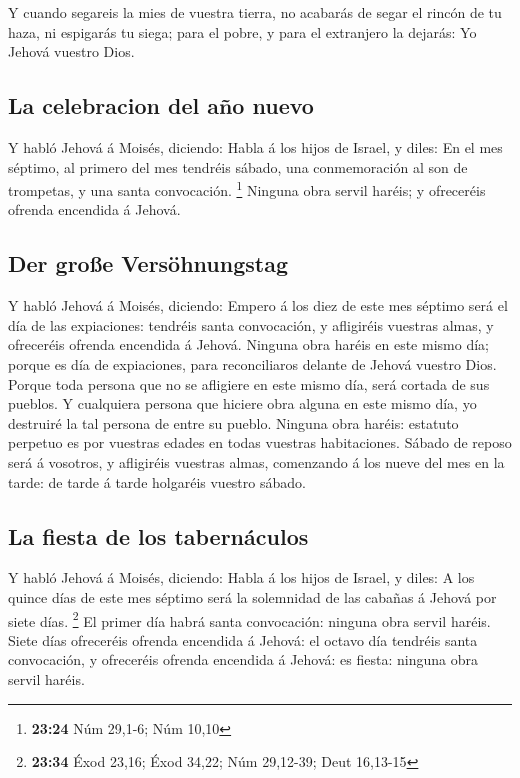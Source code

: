  Y cuando segareis la mies de vuestra tierra, no acabarás
de segar el rincón de tu haza, ni espigarás tu siega; para el pobre, y
para el extranjero la dejarás: Yo Jehová vuestro Dios.

\hypertarget{la-celebracion-del-auxf1o-nuevo}{%
\subsection{La celebracion del año
nuevo}\label{la-celebracion-del-auxf1o-nuevo}}

 Y habló Jehová á Moisés, diciendo:  Habla á
los hijos de Israel, y diles: En el mes séptimo, al primero del mes
tendréis sábado, una conmemoración al son de trompetas, y una santa
convocación. \footnote{\textbf{23:24} Núm 29,1-6; Núm 10,10}
 Ninguna obra servil haréis; y ofreceréis ofrenda encendida
á Jehová.

\hypertarget{der-grouxdfe-versuxf6hnungstag}{%
\subsection{Der große
Versöhnungstag}\label{der-grouxdfe-versuxf6hnungstag}}

 Y habló Jehová á Moisés, diciendo:  Empero á
los diez de este mes séptimo será el día de las expiaciones: tendréis
santa convocación, y afligiréis vuestras almas, y ofreceréis ofrenda
encendida á Jehová.  Ninguna obra haréis en este mismo día;
porque es día de expiaciones, para reconciliaros delante de Jehová
vuestro Dios.  Porque toda persona que no se afligiere en
este mismo día, será cortada de sus pueblos.  Y cualquiera
persona que hiciere obra alguna en este mismo día, yo destruiré la tal
persona de entre su pueblo.  Ninguna obra haréis: estatuto
perpetuo es por vuestras edades en todas vuestras habitaciones.
 Sábado de reposo será á vosotros, y afligiréis vuestras
almas, comenzando á los nueve del mes en la tarde: de tarde á tarde
holgaréis vuestro sábado.

\hypertarget{la-fiesta-de-los-tabernuxe1culos}{%
\subsection{La fiesta de los
tabernáculos}\label{la-fiesta-de-los-tabernuxe1culos}}

 Y habló Jehová á Moisés, diciendo:  Habla á
los hijos de Israel, y diles: A los quince días de este mes séptimo será
la solemnidad de las cabañas á Jehová por siete días. \footnote{\textbf{23:34}
  Éxod 23,16; Éxod 34,22; Núm 29,12-39; Deut 16,13-15}  El
primer día habrá santa convocación: ninguna obra servil haréis.
 Siete días ofreceréis ofrenda encendida á Jehová: el
octavo día tendréis santa convocación, y ofreceréis ofrenda encendida á
Jehová: es fiesta: ninguna obra servil haréis.

